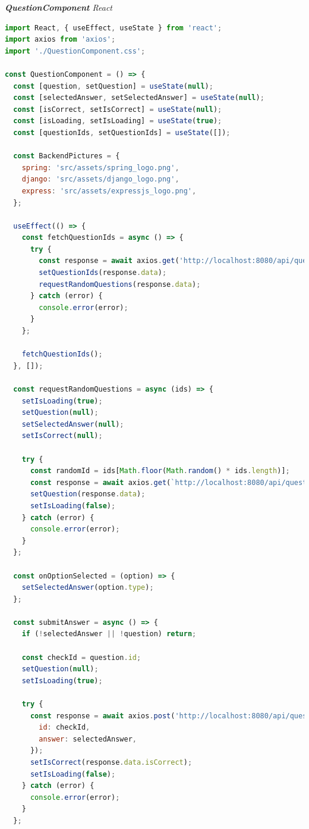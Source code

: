 \documentclass[biblatex]{lni}
\begin{document}
\textit{\textbf{QuestionComponent} React} \\
\begin{lstlisting}[caption={QuestionComponent.jsx}, label=qc-rc, language=javascript]
import React, { useEffect, useState } from 'react';
import axios from 'axios';
import './QuestionComponent.css';

const QuestionComponent = () => {
  const [question, setQuestion] = useState(null);
  const [selectedAnswer, setSelectedAnswer] = useState(null);
  const [isCorrect, setIsCorrect] = useState(null);
  const [isLoading, setIsLoading] = useState(true);
  const [questionIds, setQuestionIds] = useState([]);

  const BackendPictures = {
    spring: 'src/assets/spring_logo.png',
    django: 'src/assets/django_logo.png',
    express: 'src/assets/expressjs_logo.png',
  };

  useEffect(() => {
    const fetchQuestionIds = async () => {
      try {
        const response = await axios.get('http://localhost:8080/api/question/ids');
        setQuestionIds(response.data);
        requestRandomQuestions(response.data);
      } catch (error) {
        console.error(error);
      }
    };

    fetchQuestionIds();
  }, []);

  const requestRandomQuestions = async (ids) => {
    setIsLoading(true);
    setQuestion(null);
    setSelectedAnswer(null);
    setIsCorrect(null);

    try {
      const randomId = ids[Math.floor(Math.random() * ids.length)];
      const response = await axios.get(`http://localhost:8080/api/question/${randomId}`);
      setQuestion(response.data);
      setIsLoading(false);
    } catch (error) {
      console.error(error);
    }
  };

  const onOptionSelected = (option) => {
    setSelectedAnswer(option.type);
  };

  const submitAnswer = async () => {
    if (!selectedAnswer || !question) return;

    const checkId = question.id;
    setQuestion(null);
    setIsLoading(true);

    try {
      const response = await axios.post('http://localhost:8080/api/question', {
        id: checkId,
        answer: selectedAnswer,
      });
      setIsCorrect(response.data.isCorrect);
      setIsLoading(false);
    } catch (error) {
      console.error(error);
    }
  };


\end{lstlisting}
\end{document}
